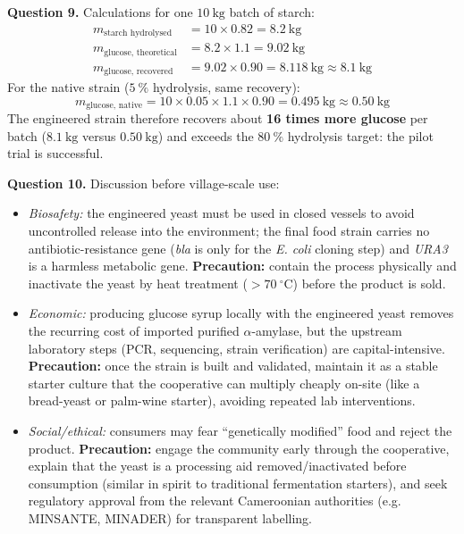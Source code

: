 \documentclass[11pt]{article}
\newcommand{\cle}[1]{{\popxbold\color{popdark}#1}}
\begin{document}
\textbf{Question 9.} Calculations for one $10\ \mathrm{kg}$ batch of starch:
\begin{align*}
m_{\text{starch hydrolysed}} &= 10 \times 0.82 = 8.2\ \mathrm{kg}\\
m_{\text{glucose, theoretical}} &= 8.2 \times 1.1 = 9.02\ \mathrm{kg}\\
m_{\text{glucose, recovered}} &= 9.02 \times 0.90 = 8.118\ \mathrm{kg} \approx 8.1\ \mathrm{kg}
\end{align*}
For the native strain ($5\ \%$ hydrolysis, same recovery):
\[
m_{\text{glucose, native}} = 10 \times 0.05 \times 1.1 \times 0.90 = 0.495\ \mathrm{kg} \approx 0.50\ \mathrm{kg}
\]
The engineered strain therefore recovers about \textbf{16 times more glucose} per batch ($8.1\ \mathrm{kg}$ versus $0.50\ \mathrm{kg}$) and exceeds the $80\ \%$ hydrolysis target: the pilot trial is successful.

\textbf{Question 10.} Discussion before village-scale use:
\begin{itemize}
\item \emph{Biosafety:} the engineered yeast must be used in closed vessels to avoid uncontrolled release into the environment; the final food strain carries no antibiotic-resistance gene (\emph{bla} is only for the \emph{E. coli} cloning step) and \emph{URA3} is a harmless metabolic gene. \textbf{Precaution:} contain the process physically and inactivate the yeast by heat treatment ($>70\ ^{\circ}\mathrm{C}$) before the product is sold.
\item \emph{Economic:} producing glucose syrup locally with the engineered yeast removes the recurring cost of imported purified $\alpha$-amylase, but the upstream laboratory steps (PCR, sequencing, strain verification) are capital-intensive. \textbf{Precaution:} once the strain is built and validated, maintain it as a stable starter culture that the cooperative can multiply cheaply on-site (like a bread-yeast or palm-wine starter), avoiding repeated lab interventions.
\item \emph{Social/ethical:} consumers may fear ``genetically modified'' food and reject the product. \textbf{Precaution:} engage the community early through the cooperative, explain that the yeast is a \cle{processing aid} removed/inactivated before consumption (similar in spirit to traditional fermentation starters), and seek regulatory approval from the relevant Cameroonian authorities (e.g. MINSANTE, MINADER) for transparent labelling.
\end{itemize}
\end{document}
